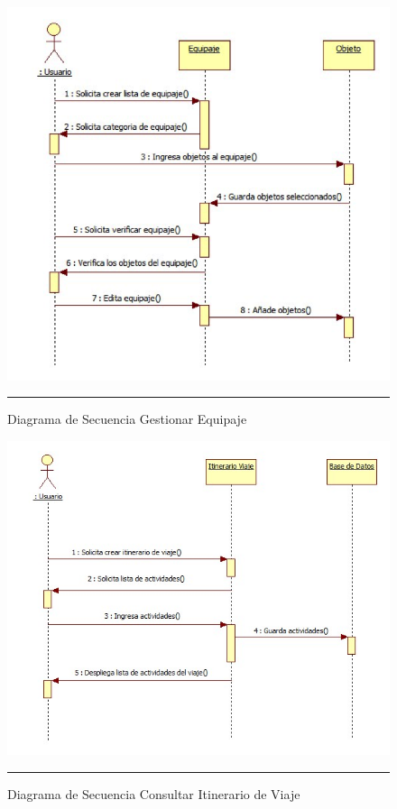 \begin{figure}[H]
	\centering
		\includegraphics[width=1\textwidth]{Figuras/secGestionarEquipaje.png}
		\rule{30em}{0.5pt}
	\caption[Diagrama de Secuencia Gestionar Equipaje]{Diagrama de Secuencia Gestionar Equipaje}
	\label{fig:secGestionarEquipaje}
\end{figure}

\begin{figure}[H]
	\centering
		\includegraphics[width=1\textwidth]{Figuras/ConsultarItinerario.jpg}
		\rule{30em}{0.5pt}
	\caption[Diagrama de Secuencia Consultar Itinerario de Viaje]{Diagrama de Secuencia Consultar Itinerario de Viaje}
	\label{fig:secConsultarItinerarioViaje}
\end{figure}

